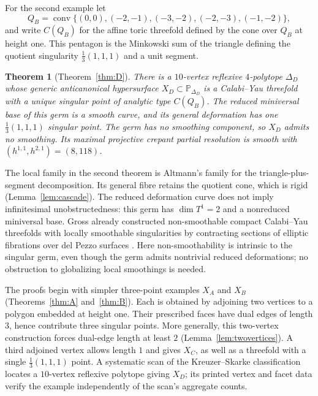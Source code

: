 \documentclass[11pt]{amsart}
\newtheorem{theorem}{Theorem}[section]
\theoremstyle{definition}
\theoremstyle{remark}
\newcommand{\PP}{\mathbb{P}}
\newcommand{\conv}{\operatorname{conv}}
\begin{document}
For the second example let
\[
Q_B=\conv\{(0,0),(-2,-1),(-3,-2),(-2,-3),(-1,-2)\},
\]
and write $C(Q_B)$ for the affine toric threefold defined by the cone over
$Q_B$ at height one.  This pentagon is the Minkowski sum of the triangle
defining the quotient singularity $\frac13(1,1,1)$ and a unit segment.

\begin{theorem}[Theorem~\ref{thm:D}]\label{thm:introB}
There is a $10$-vertex reflexive $4$-polytope $\Delta_D$ whose generic
anticanonical hypersurface $X_D\subset\PP_{\Delta_D}$ is a Calabi--Yau
threefold with a unique singular point of analytic type $C(Q_B)$.
The reduced miniversal base of this germ is a smooth curve, and its
general deformation has one $\frac13(1,1,1)$ singular point.  The germ has
no smoothing component, so $X_D$ admits no smoothing.  Its maximal
projective crepant partial resolution is smooth with
$(h^{1,1},h^{2,1})=(8,118)$.
\end{theorem}

The local family in the second theorem is Altmann's family for the
triangle-plus-segment decomposition.  Its general fibre retains the quotient
cone, which is rigid (Lemma~\ref{lem:cascade}).  The reduced deformation
curve does not imply infinitesimal unobstructedness: this germ has
$\dim T^1=2$ and a nonreduced miniversal base.  Gross already constructed
non-smoothable compact Calabi--Yau threefolds with locally smoothable
singularities by contracting sections of elliptic fibrations over del Pezzo
surfaces \cite[Example~4.1]{Gross97}.  Here non-smoothability is intrinsic to
the singular germ, even though the germ admits nontrivial reduced
deformations; no obstruction to globalizing local smoothings is needed.

The proofs begin with simpler three-point examples $X_A$ and $X_B$
(Theorems~\ref{thm:A} and~\ref{thm:B}).  Each is obtained by adjoining two
vertices to a polygon embedded at height one.  Their prescribed faces have
dual edges of length $3$, hence contribute three singular points.
More generally, this two-vertex construction forces dual-edge length at
least $2$ (Lemma~\ref{lem:twovertices}).  A third adjoined vertex allows
length $1$ and gives $X_C$, as well as a threefold with a single
$\frac13(1,1,1)$ point.  A systematic scan of the Kreuzer--Skarke
classification \cite{KreuzerSkarke00} locates a $10$-vertex reflexive
polytope giving $X_D$; its printed vertex and facet data verify the example
independently of the scan's aggregate counts.
\end{document}
